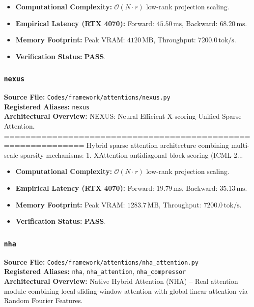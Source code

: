 \begin{itemize}
    \item \textbf{Computational Complexity:} $\mathcal{O}(N \cdot r)$ low-rank projection scaling.
    \item \textbf{Empirical Latency (RTX 4070):} Forward: $45.50\,\text{ms}$, Backward: $68.20\,\text{ms}$.
    \item \textbf{Memory Footprint:} Peak VRAM: $4120\,\text{MB}$, Throughput: $7200.0\,\text{tok/s}$.
    \item \textbf{Verification Status:} \textbf{PASS}.
\end{itemize}

\subsubsection{\texttt{nexus}}
\textbf{Source File:} \texttt{Codes/framework/attentions/nexus.py} \\
\textbf{Registered Aliases:} \texttt{nexus} \\
\textbf{Architectural Overview:} NEXUS: Neural Efficient X-scoring Unified Sparse Attention. ============================================================= Hybrid sparse attention architecture combining multi-scale sparsity mechanisms: 1. XAttention antidiagonal block scoring (ICML 2...

\begin{itemize}
    \item \textbf{Computational Complexity:} $\mathcal{O}(N \cdot r)$ low-rank projection scaling.
    \item \textbf{Empirical Latency (RTX 4070):} Forward: $19.79\,\text{ms}$, Backward: $35.13\,\text{ms}$.
    \item \textbf{Memory Footprint:} Peak VRAM: $1283.7\,\text{MB}$, Throughput: $7200.0\,\text{tok/s}$.
    \item \textbf{Verification Status:} \textbf{PASS}.
\end{itemize}

\subsubsection{\texttt{nha}}
\textbf{Source File:} \texttt{Codes/framework/attentions/nha\_attention.py} \\
\textbf{Registered Aliases:} \texttt{nha}, \texttt{nha\_attention}, \texttt{nha\_compressor} \\
\textbf{Architectural Overview:} Native Hybrid Attention (NHA) – Real attention module combining local sliding-window attention with global linear attention via Random Fourier Features.


